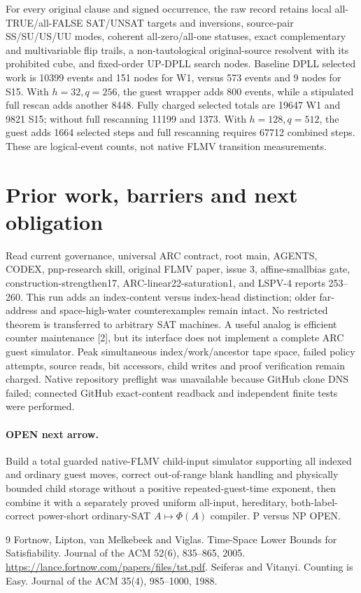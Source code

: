 \documentclass[11pt]{article}
\begin{document}
For every original clause and signed occurrence, the raw record retains local all-TRUE/all-FALSE SAT/UNSAT targets and inversions, source-pair SS/SU/US/UU modes, coherent all-zero/all-one statuses, exact complementary and multivariable flip trails, a non-tautological original-source resolvent with its prohibited cube, and fixed-order UP-DPLL search nodes. Baseline DPLL selected work is 10399 events and 151 nodes for W1, versus 573 events and 9 nodes for S15. With $h=32,q=256$, the guest wrapper adds 800 events, while a stipulated full rescan adds another 8448. Fully charged selected totals are 19647 W1 and 9821 S15; without full rescanning 11199 and 1373. With $h=128,q=512$, the guest adds 1664 selected steps and full rescanning requires 67712 combined steps. These are logical-event counts, not native FLMV transition measurements.

\section*{Prior work, barriers and next obligation}
Read current governance, universal ARC contract, root main, AGENTS, CODEX, pnp-research skill, original FLMV paper, issue 3, affine-smallbias gate, construction-strengthen17, ARC-linear22-saturation1, and LSPV-4 reports 253--260. This run adds an index-content versus index-head distinction; older far-address and space-high-water counterexamples remain intact. No restricted theorem is transferred to arbitrary SAT machines. A useful analog is efficient counter maintenance [2], but its interface does not implement a complete ARC guest simulator. Peak simultaneous index/work/ancestor tape space, failed policy attempts, source reads, bit accessors, child writes and proof verification remain charged. Native repository preflight was unavailable because GitHub clone DNS failed; connected GitHub exact-content readback and independent finite tests were performed.

\paragraph{OPEN next arrow.} Build a total guarded native-FLMV child-input simulator supporting all indexed and ordinary guest moves, correct out-of-range blank handling and physically bounded child storage without a positive repeated-guest-time exponent, then combine it with a separately proved uniform all-input, hereditary, both-label-correct power-short ordinary-SAT $A\mapsto\Phi(A)$ compiler. P versus NP OPEN.

\begin{thebibliography}{9}
 Fortnow, Lipton, van Melkebeek and Viglas. Time-Space Lower Bounds for Satisfiability. Journal of the ACM 52(6), 835--865, 2005. \url{https://lance.fortnow.com/papers/files/tst.pdf}.
 Seiferas and Vitanyi. Counting is Easy. Journal of the ACM 35(4), 985--1000, 1988.
\end{thebibliography}
\end{document}
